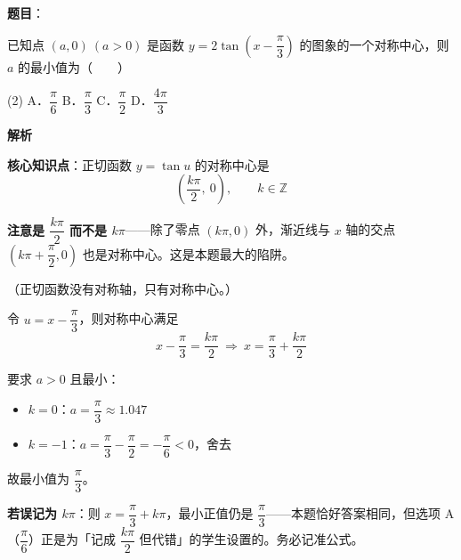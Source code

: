 \begin{answer}

\textbf{题目}：

已知点 $(a,0)\ (a>0)$ 是函数 $y=2\tan\left(x-\dfrac{\pi}{3}\right)$ 的图象的一个对称中心，则 $a$ 的最小值为\mbox{（　　）}

\begin{gkopts}(2)
\task A．$\dfrac{\pi}{6}$
\task B．$\dfrac{\pi}{3}$
\task C．$\dfrac{\pi}{2}$
\task D．$\dfrac{4\pi}{3}$
\end{gkopts}

\textbf{解析}

\textbf{核心知识点}：正切函数 $y=\tan u$ 的对称中心是
\nopagebreak[4]
\[\left(\frac{k\pi}{2},\ 0\right),\qquad k\in\mathbb{Z}\]

\textbf{注意是 $\dfrac{k\pi}{2}$ 而不是 $k\pi$}——除了零点 $(k\pi,0)$ 外，渐近线与 $x$ 轴的交点 $\left(k\pi+\dfrac\pi2,0\right)$ 也是对称中心。这是本题最大的陷阱。

（正切函数没有对称轴，只有对称中心。）

令 $u=x-\dfrac\pi3$，则对称中心满足
\nopagebreak[4]
\[x-\frac\pi3=\frac{k\pi}{2}\ \Longrightarrow\ x=\frac\pi3+\frac{k\pi}{2}\]

要求 $a>0$ 且最小：

\begin{itemize}
\item $k=0$：$a=\dfrac\pi3\approx1.047$
\item $k=-1$：$a=\dfrac\pi3-\dfrac\pi2=-\dfrac\pi6<0$，舍去
\end{itemize}

故最小值为 $\dfrac\pi3$。

\begin{gktip}
\textbf{若误记为 $k\pi$}：则 $x=\dfrac\pi3+k\pi$，最小正值仍是 $\dfrac\pi3$——本题恰好答案相同，但选项 A（$\dfrac\pi6$）正是为「记成 $\dfrac{k\pi}{2}$ 但代错」的学生设置的。务必记准公式。
\end{gktip}


\par\medskip

\end{answer}
